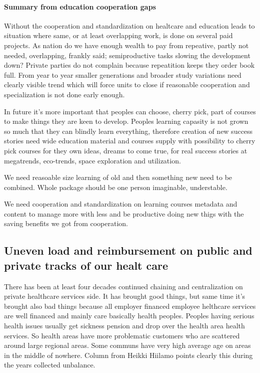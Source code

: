 \paragraph{Summary from education cooperation gaps}
\label{education_cooperation_gaps}

Without the cooperation and standardization on healtcare and education leads
to situation where same, or at least overlapping work, is done on several paid
projects. As nation do we have enough wealth to pay from repeative, partly not
needed, overlapping, frankly said; semi\-productive tasks slowing the
development down? Private parties do not complain because repeatition keeps
they order book full. From year to year smaller generations and broader study
variations need clearly visible trend which will force units to close if
reasonable cooperation and specialization is not done early enough.

In future it's more important that peoples can choose, cherry pick, part of
courses to make things they are keen to develop. Peoples learning capasity
is not grown so much that they can blindly learn everything, therefore
creation of new success stories need wide education material and courses
supply with possibility to cherry pick courses for they own ideas, dreams
to come true, for real success stories at megatrends, eco-trends, space
exploration and utilization.

We need reasoable size learning of old and then something new need to
be combined. Whole package should be one person imaginable, understable.

We need cooperation and standardization on learning courses metadata and
content to manage more with less and be productive doing new thigs with
the saving benefits we got from cooperation.

\subsection{Uneven load and reimbursement on public and private tracks of our healt care}
\label{unbalance_on_two_tracks}
There has been at least four decades continued chaining and centralization on
private healthcare services side. It has brought good things, but same time
it's brought also bad things because all employer financed employee helthcare
services are well financed and mainly care basically health peoples. Peoples
having serious health issues usually get sickness pension and drop over the
health area health services. So health areas have more problematic customers
who are scattered around large regional areas. Some communs have very high
average age on areas in the middle of nowhere. Column from Heikki Hiilamo
\cite{HiilamonKolumni202411250645} points clearly this during the years
collected unbalance.

